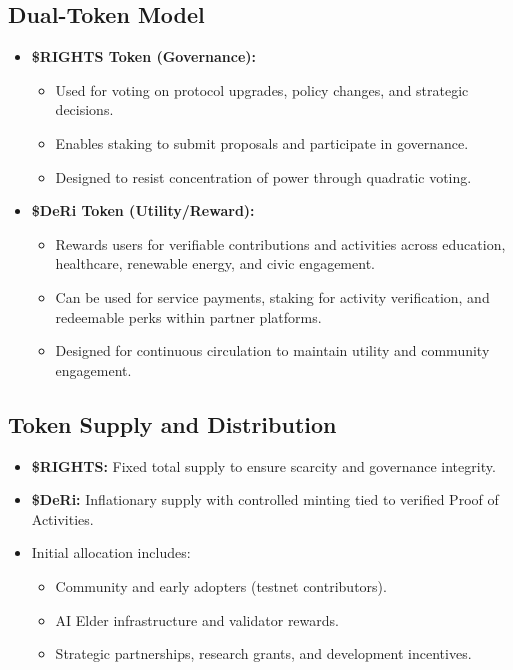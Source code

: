 \documentclass[11pt,a4paper]{article}
\begin{document}
\subsection{Dual-Token Model}
\begin{itemize}
    \item \textbf{\$RIGHTS Token (Governance):}  
        \begin{itemize}
            \item Used for voting on protocol upgrades, policy changes, and strategic decisions.  
            \item Enables staking to submit proposals and participate in governance.  
            \item Designed to resist concentration of power through quadratic voting.  
        \end{itemize}
    \item \textbf{\$DeRi Token (Utility/Reward):}  
        \begin{itemize}
            \item Rewards users for verifiable contributions and activities across education, healthcare, renewable energy, and civic engagement.  
            \item Can be used for service payments, staking for activity verification, and redeemable perks within partner platforms.  
            \item Designed for continuous circulation to maintain utility and community engagement.  
        \end{itemize}
\end{itemize}

\subsection{Token Supply and Distribution}
\begin{itemize}
    \item \textbf{\$RIGHTS:} Fixed total supply to ensure scarcity and governance integrity.  
    \item \textbf{\$DeRi:} Inflationary supply with controlled minting tied to verified Proof of Activities.  
    \item Initial allocation includes:  
        \begin{itemize}
            \item Community and early adopters (testnet contributors).  
            \item AI Elder infrastructure and validator rewards.  
            \item Strategic partnerships, research grants, and development incentives.  
        \end{itemize}
\end{itemize}
\end{document}
